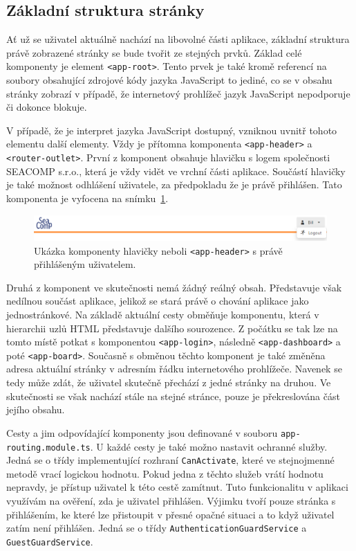 \subsection{Základní struktura stránky}
Ať už se uživatel aktuálně nachází na libovolné části aplikace, základní struktura právě zobrazené stránky se bude tvořit ze stejných prvků. Základ celé komponenty je element \texttt{<app-root>}. Tento prvek je také kromě referencí na soubory obsahující zdrojové kódy jazyka JavaScript to jediné, co se v obsahu stránky zobrazí v případě, že internetový prohlížeč jazyk JavaScript nepodporuje či dokonce blokuje. 

V případě, že je interpret jazyka JavaScript dostupný, vzniknou uvnitř tohoto elementu další elementy. Vždy je přítomna komponenta \texttt{<app-header>} a \texttt{<router-outlet>}. První z komponent obsahuje hlavičku s logem společnosti SEACOMP s.r.o., která je vždy vidět ve vrchní části aplikace. Součástí hlavičky je také možnost odhlášení uživatele, za předpokladu že je právě přihlášen. Tato komponenta je vyfocena na snímku~\ref{img:comp-header}.


\begin{figure}[H]
	\centering
	\label{img:comp-header}
	\includegraphics[width=\textwidth]{obrazky-figures/comp-header.png}
	\caption{Ukázka komponenty hlavičky neboli \texttt{<app-header>} s právě přihlášeným uživatelem.}
\end{figure}

Druhá z komponent ve skutečnosti nemá žádný reálný obsah. Představuje však nedílnou součást aplikace, jelikož se stará právě o chování aplikace jako jednostránkové. Na základě aktuální cesty obměňuje komponentu, která v hierarchii uzlů HTML představuje dalšího sourozence. Z počátku se tak lze na tomto místě potkat s komponentou \texttt{<app-login>}, následně \texttt{<app-dashboard>} a poté \texttt{<app-board>}. Současně s obměnou těchto komponent je také změněna adresa aktuální stránky v adresním řádku internetového prohlížeče. Navenek se tedy může zdát, že uživatel skutečně přechází z jedné stránky na druhou. Ve skutečnosti se však nachází stále na stejné stránce, pouze je překreslována část jejího obsahu.

Cesty a jim odpovídající komponenty jsou definované v souboru \texttt{app-routing.module.ts}. U každé cesty je také možno nastavit ochranné služby. Jedná se o třídy implementující rozhraní \texttt{CanActivate}, které ve stejnojmenné metodě vrací logickou hodnotu. Pokud jedna z těchto služeb vrátí hodnotu nepravdy, je přístup uživatel k této cestě zamítnut. Tuto funkcionalitu v aplikaci využívám na ověření, zda je uživatel přihlášen. Výjimku tvoří pouze stránka s přihlášením, ke které lze přistoupit v přesné opačné situaci a to když uživatel zatím není přihlášen. Jedná se o třídy \texttt{AuthenticationGuardService} a \texttt{GuestGuardService}.


